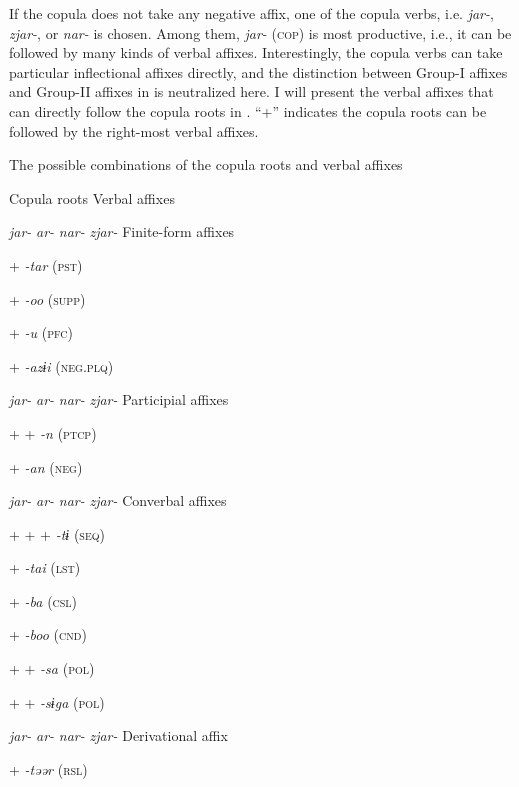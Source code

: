   If the copula does not take any negative affix, one of the copula verbs, i.e. \textit{jar-}, \textit{zjar-}, or \textit{nar-} is chosen. Among them, \textit{jar-} (\textsc{cop}) is most productive, i.e., it can be followed by many kinds of verbal affixes. Interestingly, the copula verbs can take particular inflectional affixes directly, and the distinction between Group-I affixes and Group-II affixes in  is neutralized here. I will present the verbal affixes that can directly follow the copula roots in . “+” indicates the copula roots can be followed by the right-most verbal affixes.

\begin{table}
\caption{\label{tab:key:75}The possible combinations of the copula roots and verbal affixes}

Copula roots  Verbal affixes

\textit{jar-}  \textit{ar-}  \textit{nar-}  \textit{zjar-}  Finite-form affixes

+        \textit{-tar} (\textsc{pst})

+        \textit{-oo} (\textsc{supp})

  +      \textit{-u} (\textsc{pfc})

  +      \textit{-azɨi} (\textsc{neg}.\textsc{plq})

\textit{jar-}  \textit{ar-}  \textit{nar-}  \textit{zjar-}  Participial affixes

+      +  \textit{-n} (\textsc{ptcp})

  +      \textit{-an} (\textsc{neg})

\textit{jar-}  \textit{ar-}  \textit{nar-}  \textit{zjar-}  Converbal affixes

+  +  +    \textit{-tɨ} (\textsc{seq})

+        \textit{-tai} (\textsc{lst})

+        \textit{-ba} (\textsc{csl})

+        \textit{-boo} (\textsc{cnd})

+      +  \textit{-sa} (\textsc{pol})

+      +  \textit{-sɨga} (\textsc{pol})

\textit{jar-}  \textit{ar-}  \textit{nar-}  \textit{zjar-}  Derivational affix

+        \textit{-təər} (\textsc{rsl})
\end{table}

